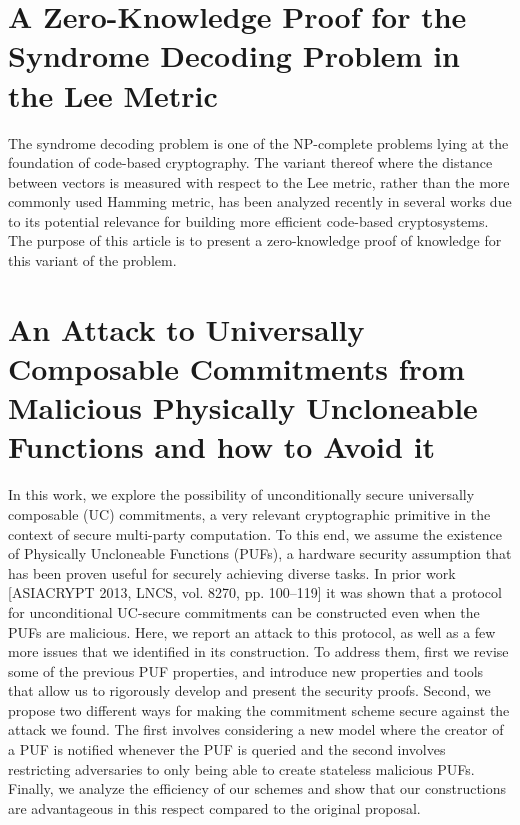 \documentclass[11pt]{article}
\theoremstyle{definition}
\theoremstyle{remark}
\theoremstyle{plain}
\begin{document}
\section{\cite{cryptoeprint:2025/1373} A Zero-Knowledge Proof for the Syndrome Decoding Problem in the Lee Metric}
The syndrome decoding problem is one of the NP-complete problems lying at the foundation of code-based cryptography. The variant thereof where the distance between vectors is measured with respect to the Lee metric, rather than the more commonly used Hamming metric, has been analyzed recently in several works due to its potential relevance for building more efficient code-based cryptosystems. The purpose of this article is to present a zero-knowledge proof of knowledge for this variant of the problem.

\section{\cite{cryptoeprint:2025/1374} An Attack to Universally Composable Commitments from Malicious Physically Uncloneable Functions and how to Avoid it}
In this work, we explore the possibility of unconditionally secure universally composable (UC) commitments, a very relevant cryptographic primitive in the context of secure multi-party computation. To this end, we assume the existence of Physically Uncloneable Functions (PUFs), a hardware security assumption
that has been proven useful for securely achieving diverse tasks. In prior work [ASIACRYPT 2013, LNCS, vol. 8270, pp. 100–119] it was shown that a protocol for unconditional UC-secure commitments can be constructed even when the PUFs are malicious. Here, we report an attack to this protocol, as well as a few more issues that we identified in its construction. To address them, first we revise some of the previous PUF properties, and introduce new properties and tools that allow us to rigorously develop and present the security proofs. Second, we propose two different ways for making the commitment scheme secure against the attack we found. The first involves considering a new model where the creator of a PUF is notified whenever the PUF is queried
and the second involves restricting adversaries to only being able to create stateless malicious PUFs. Finally, we analyze the efficiency of our schemes and show that our constructions are advantageous in this respect compared to the original proposal.

\printbibliography
\end{document}
